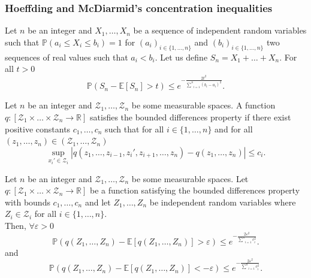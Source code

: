 \documentclass[twoside,11pt]{article}
\newcommand{\R}{\mathbb{R}}%
\newcommand{\PP}{\mathbb{P}}%
\newcommand{\EE}{\mathbb{E}}%
\renewcommand{\P}{\mathbb{P}}
\begin{document}
\subsubsection*{Hoeffding and McDiarmid's concentration inequalities}
\begin{theorem}
\label{Hoeffding_inequality}
Let $n$ be an integer and $X_1,\ldots,X_n$ be a sequence of independent random variables such that $\P\left( a_i \leq X_i \leq b_i \right) =1$ for $\left(a_i\right)_{i \in \{1,\ldots,n\}}$ and $\left(b_i\right)_{i \in \{1,\ldots,n\}}$ two sequences of real values such that $a_i < b_i$. Let us define $S_n = X_1 + \ldots + X_n$. For all $t>0$ 
\begin{equation*}
    \P \left( S_n - \mathbb{E}[S_n] > t \right) \leq e^{-\frac{2 t^2}{\underset{i=1}{\overset{n}{\sum}} \left(b_i - a_i \right)^2}}.
\end{equation*}
\end{theorem}
\begin{definition}
\label{def_bounded_difference_property}
Let $n$ be an integer and $\mathcal{Z}_1,\ldots,\mathcal{Z}_n$ be some measurable spaces. A function $q: [\mathcal{Z}_1 \times \ldots \times \mathcal{Z}_n \longrightarrow \R]$ satisfies the bounded differences property if there exist positive constants $c_1,\ldots,c_n$ such that for all $i \in \{1,\ldots,n\}$ and for all $\left(z_1,\ldots,z_n\right) \in \left(\mathcal{Z}_1, \ldots, \mathcal{Z}_n\right)$ 
\begin{equation*}
    \underset{x_i' \in \mathcal{Z}_i}{\sup} \left | q\left(z_1,\ldots,z_{i-1},z_i',z_{i+1},\ldots,z_n\right) - q\left(z_1,\ldots,z_n\right) \right | \leq c_i.
\end{equation*}
\end{definition}
\begin{theorem}
    Let $n$ be an integer and $\mathcal{Z}_1,\ldots,\mathcal{Z}_n$ be some measurable spaces. Let $q : [\mathcal{Z}_1 \times \ldots \times \mathcal{Z}_n \longrightarrow \R]$ be a function satisfying the bounded differences property with bounds $c_1,\ldots,c_n$ and let $Z_1, \ldots, Z_n$ be independent random variables where $Z_i \in \mathcal{Z}_i$ for all $i \in \{1,\ldots,n\}$. \\
    Then, $\forall \varepsilon >0$ 
    \begin{equation*}
        \PP \left( q\left(Z_1,\ldots,Z_n\right) - \EE \left[q\left(Z_1,\ldots,Z_n\right) \right] > \varepsilon \right) \leq e^{- \frac{2 \varepsilon^2}{\underset{i=1}{\overset{n}{\sum}} c_i^2}}.
    \end{equation*}
    and
    \begin{equation*}
        \PP \left( q\left(Z_1,\ldots,Z_n\right) - \EE \left[q\left(Z_1,\ldots,Z_n\right) \right] < -\varepsilon \right) \leq e^{- \frac{2 \varepsilon^2}{\underset{i=1}{\overset{n}{\sum}} c_i^2}}.
    \end{equation*}
    \label{McDiarmid's theo}
\end{theorem}
\end{document}
